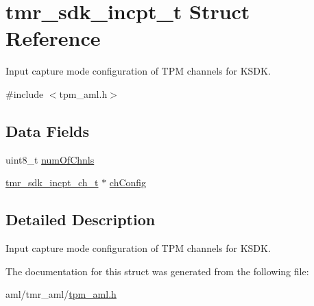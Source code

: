 \hypertarget{structtmr__sdk__incpt__t}{}\section{tmr\+\_\+sdk\+\_\+incpt\+\_\+t Struct Reference}
\label{structtmr__sdk__incpt__t}


Input capture mode configuration of T\+PM channels for K\+S\+DK.  




{\ttfamily \#include $<$tpm\+\_\+aml.\+h$>$}

\subsection*{Data Fields}
\begin{DoxyCompactItemize}
\item 
uint8\+\_\+t \mbox{\hyperlink{group__struct__group_ga04fc2b7b992637ebdbf5567107730087}{num\+Of\+Chnls}}
\item 
\mbox{\hyperlink{structtmr__sdk__incpt__ch__t}{tmr\+\_\+sdk\+\_\+incpt\+\_\+ch\+\_\+t}} $\ast$ \mbox{\hyperlink{group__struct__group_ga54e0c6a0ab1806a999058d00958e42d2}{ch\+Config}}
\end{DoxyCompactItemize}


\subsection{Detailed Description}
Input capture mode configuration of T\+PM channels for K\+S\+DK. 

The documentation for this struct was generated from the following file\+:\begin{DoxyCompactItemize}
\item 
aml/tmr\+\_\+aml/\mbox{\hyperlink{tpm__aml_8h}{tpm\+\_\+aml.\+h}}\end{DoxyCompactItemize}

